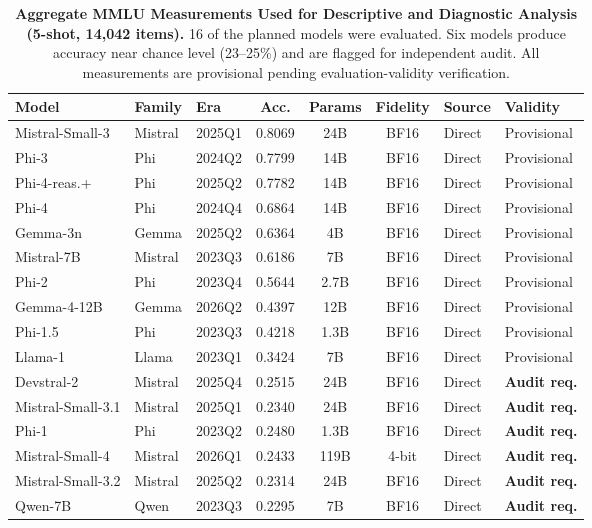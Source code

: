 \documentclass{ieeeaccess}
\theoremstyle{definition}
\theoremstyle{plain}
\begin{document}
\begin{table}[!htbp]
\caption{\textbf{Aggregate MMLU Measurements Used for Descriptive and Diagnostic Analysis (5-shot, 14,042 items).} 16 of the planned models were evaluated. Six models produce accuracy near chance level (23--25\%) and are flagged for independent audit. All measurements are provisional pending evaluation-validity verification.}
\label{tab:accuracy}
\centering
\begin{tabular}{|l|l|l|c|c|c|l|l|}
\hline
\textbf{Model} & \textbf{Family} & \textbf{Era} & \textbf{Acc.} & \textbf{Params} & \textbf{Fidelity} & \textbf{Source} & \textbf{Validity} \\
\hline
Mistral-Small-3 & Mistral & 2025Q1 & 0.8069 & 24B & BF16 & Direct & Provisional \\
\hline
Phi-3 & Phi & 2024Q2 & 0.7799 & 14B & BF16 & Direct & Provisional \\
\hline
Phi-4-reas.+ & Phi & 2025Q2 & 0.7782 & 14B & BF16 & Direct & Provisional \\
\hline
Phi-4 & Phi & 2024Q4 & 0.6864 & 14B & BF16 & Direct & Provisional \\
\hline
Gemma-3n & Gemma & 2025Q2 & 0.6364 & 4B & BF16 & Direct & Provisional \\
\hline
Mistral-7B & Mistral & 2023Q3 & 0.6186 & 7B & BF16 & Direct & Provisional \\
\hline
Phi-2 & Phi & 2023Q4 & 0.5644 & 2.7B & BF16 & Direct & Provisional \\
\hline
Gemma-4-12B & Gemma & 2026Q2 & 0.4397 & 12B & BF16 & Direct & Provisional \\
\hline
Phi-1.5 & Phi & 2023Q3 & 0.4218 & 1.3B & BF16 & Direct & Provisional \\
\hline
Llama-1 & Llama & 2023Q1 & 0.3424 & 7B & BF16 & Direct & Provisional \\
\hline
Devstral-2 & Mistral & 2025Q4 & 0.2515 & 24B & BF16 & Direct & \textbf{Audit req.} \\
\hline
Mistral-Small-3.1 & Mistral & 2025Q1 & 0.2340 & 24B & BF16 & Direct & \textbf{Audit req.} \\
\hline
Phi-1 & Phi & 2023Q2 & 0.2480 & 1.3B & BF16 & Direct & \textbf{Audit req.} \\
\hline
Mistral-Small-4 & Mistral & 2026Q1 & 0.2433 & 119B & 4-bit & Direct & \textbf{Audit req.} \\
\hline
Mistral-Small-3.2 & Mistral & 2025Q2 & 0.2314 & 24B & BF16 & Direct & \textbf{Audit req.} \\
\hline
Qwen-7B & Qwen & 2023Q3 & 0.2295 & 7B & BF16 & Direct & \textbf{Audit req.} \\
\hline
\end{tabular}
\end{table}
\end{document}
